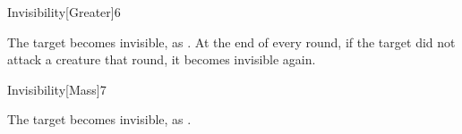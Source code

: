 \begin{spellsection}{Invisibility}[Greater]{6}
    \begin{spellheader}
    \end{spellheader}
    \begin{spellcontent}
        \begin{spelltargetinginfo}
        \end{spelltargetinginfo}
        \begin{spelleffects}
            \spelleffect The target becomes invisible, as . At the end of every round, if the target did not attack a creature that round, it becomes invisible again.
            \spelldur \durshort \dismissable
        \end{spelleffects}
    \end{spellcontent}
    \begin{spellfooter}
        \miscastrandom
    \end{spellfooter}
\end{spellsection}

\begin{spellsection}{Invisibility}[Mass]{7}
    \begin{spellheader}
    \end{spellheader}
    \begin{spellcontent}
        \begin{spelltargetinginfo}
        \end{spelltargetinginfo}
        \begin{spelleffects}
            \spelleffect The target becomes invisible, as .
            \spelldur \durshort \dismissable
        \end{spelleffects}
    \end{spellcontent}
    \begin{spellfooter}
        \miscastexplode
    \end{spellfooter}
\end{spellsection}

